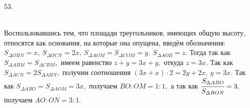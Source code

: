53. \begin{figure}[ht!]
\end{figure}\\
Воспользовавшись тем, что площади треугольников, имеющих общую высоту, относятся как основания, на которые она опущена, введём обозначения: $S_{\Delta OBN}=x,\ S_{\Delta OCN}=2x,\ S_{\Delta AOM}=S_{\Delta COM}=y,\ S_{\Delta AOB}=z.$ Тогда так как $S_{\Delta ABM}=S_{\Delta CBM},$ имеем равенство $z+y=3x+y,$ откуда $z=3x.$ Так как $S_{\Delta ACN}=2S_{\Delta ABN},$ получим соотношения $(3x+x)\cdot2=2y+2x,\ y=3x.$ Так как $S_{\Delta ABO}=S_{\Delta AOM}=3x,$ получаем $BO:OM=1:1,$ а так как $\cfrac{S_{\Delta ABO}}{S_{\Delta BON}}=3,$ получаем $AO:ON=3:1.$\\
